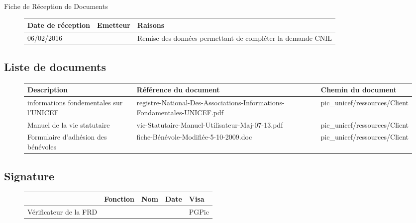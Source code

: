 \documentclass[asi, sansVersion]{picINSA}
\begin{document}
\begin{center}
\huge
\nomEquipe{}\\
Fiche de Réception de Documents\\
\end{center}
\vspace{0.5cm}


\begin{figure}[H]
		\centering
		\begin{tabularx}{17cm}{|X|X|X|}
		\hline
		\rowcolor[gray]{0.85}Date de réception & Emetteur & Raisons \\
		\hline
		06/02/2016 & \nomClient{} & Remise des données permettant de compléter la demande CNIL\\
		\hline
		\end{tabularx}
\end{figure}

\subsection*{Liste de documents}

\begin{figure}[H]
		\centering
		\begin{tabularx}{17cm}{|X|X|X|}
		\hline
		\rowcolor[gray]{0.85} Description & Référence du document & Chemin du document \\
		\hline		
		informations fondementales sur l'UNICEF & registre-National-Des-Associations-Informations-Fondamentales-UNICEF.pdf & pic\_unicef/ressources/Client \\
		\hline
		Manuel de la vie statutaire & vie-Statutaire-Manuel-Utilisateur-Maj-07-13.pdf & pic\_unicef/ressources/Client\\
		\hline
		Formulaire d'adhésion des bénévoles & fiche-Bénévole-Modifiée-5-10-2009.doc & pic\_unicef/ressources/Client\\
		\hline
		\end{tabularx}
\end{figure}

\subsection*{Signature}

\begin{figure}[H]
		\centering
		\begin{tabularx}{17cm}{|p{4cm}|X|X|X|X|}
		\hline
		\rowcolor[gray]{0.85}& Fonction & Nom & Date & Visa \\
		\hline
		 Vérificateur de la FRD & \RGC & \Mathieu &  & PGPic \\
		\hline
		\end{tabularx}
\end{figure}
\end{document}
